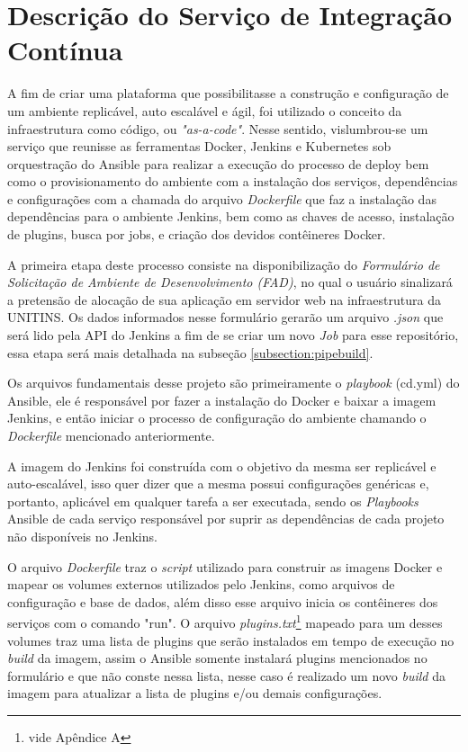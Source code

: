 \section{Descrição do Serviço de Integração Contínua}

A fim de criar uma plataforma que possibilitasse a construção e configuração de um ambiente replicável, auto escalável e ágil, foi utilizado o conceito da infraestrutura como código, ou \textit{"as-a-code"}. Nesse sentido, vislumbrou-se um serviço que reunisse as ferramentas Docker, Jenkins e Kubernetes sob orquestração do Ansible para realizar a execução do processo de deploy bem como o provisionamento do ambiente com a instalação dos serviços, dependências e configurações com a chamada do arquivo \textit{Dockerfile} que faz a instalação das dependências para o ambiente Jenkins, bem como as chaves de acesso, instalação de plugins, busca por jobs, e criação dos devidos contêineres Docker. 

A primeira etapa deste processo consiste na disponibilização do  \textit{Formulário de Solicitação de Ambiente de Desenvolvimento (FAD)}, no qual o usuário sinalizará a pretensão de alocação de sua aplicação em servidor web na infraestrutura da UNITINS. Os dados informados nesse formulário gerarão um arquivo \textit{.json} que será lido pela API do Jenkins a fim de se criar um novo \textit{Job} para esse repositório, essa etapa será mais detalhada na subseção \ref{subsection:pipebuild}.

Os arquivos fundamentais desse projeto são primeiramente o \textit{playbook }(cd.yml) do Ansible, ele é responsável por fazer a instalação do Docker e baixar a imagem Jenkins, e então iniciar o processo de configuração do ambiente chamando o \textit{Dockerfile} mencionado anteriormente.

A imagem do Jenkins foi construída com o objetivo da mesma ser replicável e auto-escalável, isso quer dizer que a mesma possui configurações genéricas e, portanto, aplicável em qualquer tarefa a ser executada, sendo os \textit{Playbooks }Ansible de cada serviço responsável por suprir as dependências de cada projeto não disponíveis no Jenkins.

O arquivo \textit{Dockerfile} traz o \textit{script} utilizado para construir as imagens Docker e mapear os volumes externos utilizados pelo Jenkins, como arquivos de configuração e base de dados, além disso esse arquivo inicia os contêineres dos serviços com o comando "run". O arquivo \textit{plugins.txt}\footnote{vide Apêndice A} mapeado para um desses volumes traz uma lista de plugins que serão instalados em tempo de execução no \textit{build} da imagem, assim o Ansible somente instalará plugins mencionados no formulário e que não conste nessa lista, nesse caso é realizado um novo \textit{build} da imagem para atualizar a lista de plugins e/ou demais configurações.

